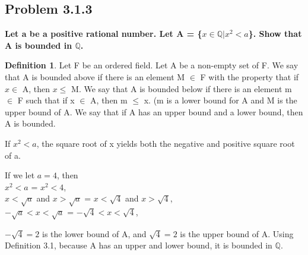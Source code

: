 \documentclass[12pt]{article}
\theoremstyle{definition}
\newtheorem{definition}[theorem]{Definition}
\numberwithin{equation}{subsection}
\begin{document}
\subsection{Problem 3.1.3}
\textbf{Let a be a positive rational number. Let A = \{$x \in \mathbb{Q}| x^{2}<a$\}. Show that A is bounded in $\mathbb{Q}$.}

\begin{definition}
Let F be an ordered field. Let A be a non-empty set of F. We say that A is bounded above if there is an element M $\in$ F with the property that if $x \in $ A, then $x \leq$ M. We say that A is bounded below if there is an element m $\in$ F such that if x $\in$ A, then m $\leq$ x. (m is a lower bound for A and M is the upper bound of A. We say that if A has an upper bound and a lower bound, then A is bounded.
\end{definition}
If $x^2 < a$, the square root of x yields both the negative and positive square root of a. 
\begin{center} 
If we let $a = 4$, then
\\
$x^2 < a$ = $x^2 < 4$,
\\
$x < \sqrt{a}$ and $x > \sqrt{a}$ = $x < \sqrt{4}$ and $x > \sqrt{4}$,
\\
$-\sqrt{a} < x < \sqrt{a}$ = $-\sqrt{4} < x < \sqrt{4}$,
\end{center}
$-\sqrt{4} = 2$ is the lower bound of A, and $\sqrt{4} = 2$ is the upper bound of A. Using Definition 3.1, because A has an upper and lower bound, it is bounded in $\mathbb Q$.
\end{document}
